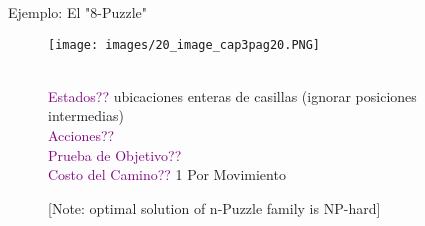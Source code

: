 \begin{frame}{Ejemplo: El "8-Puzzle"}
\begin{figure}
    \centering
    \texttt{[image: images/20\_image\_cap3pag20.PNG]}
    \begin{flushleft}
        \\ \textcolor{purple}{Estados??} ubicaciones enteras de casillas (ignorar posiciones intermedias)
        \\\textcolor{purple}{Acciones??}
        \\\textcolor{purple}{Prueba de Objetivo??}
        \\\textcolor{purple}{Costo del Camino??} 1 Por Movimiento
        
        [Note: optimal solution of n-Puzzle family is NP-hard]
    \end{flushleft}
\end{figure}{}
    
\end{frame}